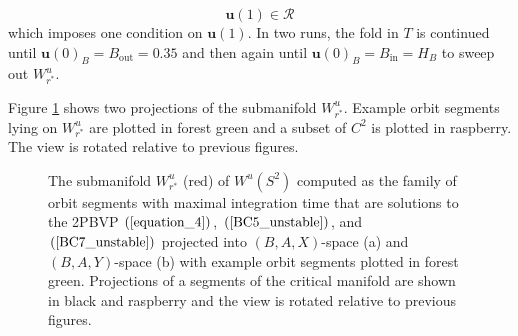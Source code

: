 \documentclass{ws-ijbc}
\begin{document}
\begin{equation}
\mathbf{u}(1) \in \mathscr{R}
\label{BC7_unstable}
\end{equation}
\noindent
which imposes one condition on $\mathbf{u}(1)$.  In two runs, the fold in $T$ is continued until $\mathbf{u}(0)_B=B_{\mathrm{out}}=0.35$ and then again until $\mathbf{u}(0)_B=B_{\mathrm{in}}=H_B$ to sweep out $W^u_{r^*}$.

Figure \ref{unstable_piece} shows two projections of the submanifold $W^u_{r^*}$.  Example orbit segments lying on $W^u_{r^*}$ are plotted in forest green and a subset of $C^2$ is plotted in raspberry.  The view is rotated relative to previous figures.

\begin{figure}[ht]
\centering
{}
\caption{The submanifold $W^u_{r^*}$ (red) of $W^u(S^2)$ computed as the family of orbit segments with maximal integration time that are solutions to the 2PBVP $(\ref{equation_4})$, $(\ref{BC5_unstable})$, and $(\ref{BC7_unstable})$ projected into $(B,A,X)$-space (a) and $(B,A,Y)$-space (b) with example orbit segments plotted in forest green.  Projections of a segments of the critical manifold are shown in black and raspberry and the view is rotated relative to previous figures.}
\label{unstable_piece}
\end{figure}
\end{document}
